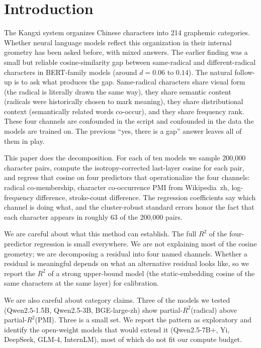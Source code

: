 \documentclass[11pt,a4paper,twocolumn]{article}
\begin{document}
\section{Introduction}

The Kangxi system organizes Chinese characters into 214 graphemic
categories. Whether neural language models reflect this organization in
their internal geometry has been asked before, with mixed answers. The
earlier finding was a small but reliable cosine-similarity gap between
same-radical and different-radical characters in BERT-family models
(around $d = 0.06$ to $0.14$). The natural follow-up is to ask what
produces the gap. Same-radical characters share visual form (the
radical is literally drawn the same way), they share semantic content
(radicals were historically chosen to mark meaning), they share
distributional context (semantically related words co-occur), and they
share frequency rank. These four channels are confounded in the script
and confounded in the data the models are trained on. The previous
``yes, there is a gap'' answer leaves all of them in play.

This paper does the decomposition. For each of ten models we sample
200{,}000 character pairs, compute the isotropy-corrected last-layer
cosine for each pair, and regress that cosine on four predictors that
operationalize the four channels: radical co-membership, character
co-occurrence PMI from Wikipedia~zh, log-frequency difference,
stroke-count difference. The regression coefficients say which channel
is doing what, and the cluster-robust standard errors honor the fact
that each character appears in roughly 63 of the 200{,}000 pairs.

We are careful about what this method can establish. The full $R^2$ of
the four-predictor regression is small everywhere. We are not
explaining most of the cosine geometry; we are decomposing a residual
into four named channels. Whether a residual is meaningful depends on
what an alternative residual looks like, so we report the $R^2$ of a
strong upper-bound model (the static-embedding cosine of the same
characters at the same layer) for calibration.

We are also careful about category claims. Three of the models we
tested (Qwen2.5-1.5B, Qwen2.5-3B, BGE-large-zh) show
partial-$R^2$(radical) above partial-$R^2$(PMI). Three is a small set.
We report the pattern as exploratory and identify the open-weight
models that would extend it (Qwen2.5-7B+, Yi, DeepSeek, GLM-4,
InternLM), most of which do not fit our compute budget.
\end{document}

